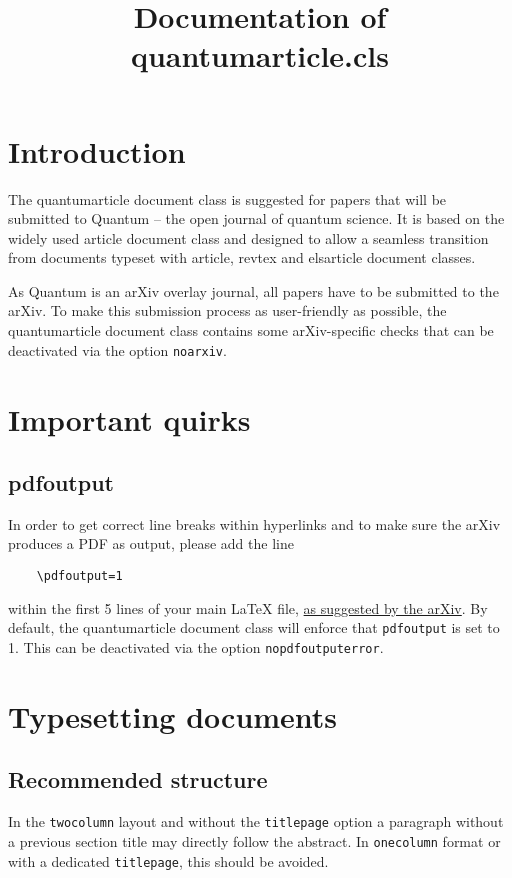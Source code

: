 \documentclass[a4paper,noarxiv,onecolumn]{quantumarticle}
\begin{document}
	\title{Documentation of quantumarticle.cls}
	\maketitle
	
	\tableofcontents
	
	\clearpage
	
	\section{Introduction}
	The quantumarticle document class is suggested for papers that will be submitted to Quantum -- the open journal of quantum science. It is based on the widely used article document class and designed to allow a seamless transition from documents typeset with article, revtex and elsarticle document classes. 
	
	As Quantum is an arXiv overlay journal, all papers have to be submitted to the arXiv. To make this submission process as user-friendly as possible, the quantumarticle document class contains some arXiv-specific checks that can be deactivated via the option \texttt{noarxiv}.
	
	\section{Important quirks}
	
	\subsection{pdfoutput}
	In order to get correct line breaks within hyperlinks and to make sure the arXiv produces a PDF as output, please add the line 
	\begin{verbatim}
	\pdfoutput=1
	\end{verbatim}
	within the first 5 lines of your main LaTeX file, \href{https://arxiv.org/help/submit_tex}{as suggested by the arXiv}. By default, the quantumarticle document class will enforce that \texttt{pdfoutput} is set to 1. This can be deactivated via the option \texttt{nopdfoutputerror}.
	
	\section{Typesetting documents}
	
	\subsection{Recommended structure}	
	In the \texttt{twocolumn} layout and without the \texttt{titlepage} option a paragraph without a previous section title may directly follow the abstract.
	In \texttt{onecolumn} format or with a dedicated \texttt{titlepage}, this should be avoided.
	
\end{document}
